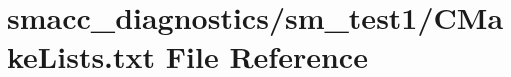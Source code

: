 \hypertarget{diagnostics_2sm__test1_2CMakeLists_8txt}{}\section{smacc\+\_\+diagnostics/sm\+\_\+test1/\+C\+Make\+Lists.txt File Reference}
\label{diagnostics_2sm__test1_2CMakeLists_8txt}
